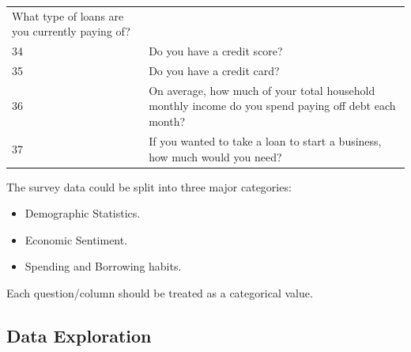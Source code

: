 \begin{longtable}[]{@{}ll@{}}
\begin{minipage}[t]{0.89\columnwidth}
What type of loans are you currently paying of?\strut
\end{minipage}\tabularnewline
\begin{minipage}[t]{0.05\columnwidth}\raggedright
34\strut
\end{minipage} & \begin{minipage}[t]{0.89\columnwidth}\raggedright
Do you have a credit score?\strut
\end{minipage}\tabularnewline
\begin{minipage}[t]{0.05\columnwidth}\raggedright
35\strut
\end{minipage} & \begin{minipage}[t]{0.89\columnwidth}\raggedright
Do you have a credit card?\strut
\end{minipage}\tabularnewline
\begin{minipage}[t]{0.05\columnwidth}\raggedright
36\strut
\end{minipage} & \begin{minipage}[t]{0.89\columnwidth}\raggedright
On average, how much of your total household monthly income do you spend
paying off debt each month?\strut
\end{minipage}\tabularnewline
\begin{minipage}[t]{0.05\columnwidth}\raggedright
37\strut
\end{minipage} & \begin{minipage}[t]{0.89\columnwidth}\raggedright
If you wanted to take a loan to start a business, how much would you
need?\strut
\end{minipage}\tabularnewline
\bottomrule
\end{longtable}

The survey data could be split into three major categories:

\begin{itemize}
\tightlist
\item
  Demographic Statistics.
\item
  Economic Sentiment.
\item
  Spending and Borrowing habits.
\end{itemize}

Each question/column should be treated as a categorical value.

\hypertarget{data-exploration}{%
\subsection{Data Exploration}\label{data-exploration}}

